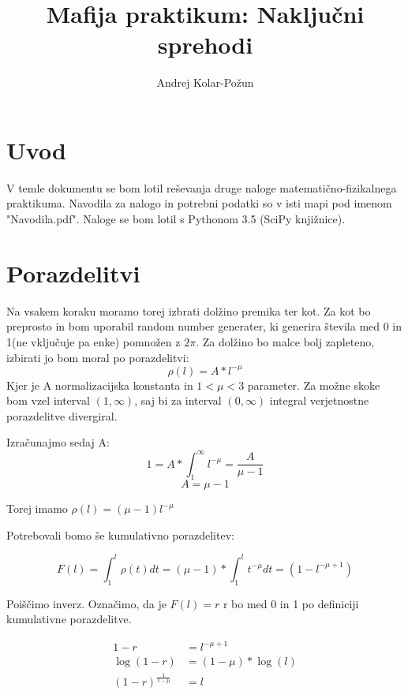 \documentclass{article}
\title{Mafija praktikum: Naklju{\v c}ni sprehodi}
\author{Andrej Kolar-Po{\v z}un}
\begin{document}
\maketitle
\newpage
{}

\section{Uvod}
V temle dokumentu se bom lotil reševanja druge naloge matematično-fizikalnega praktikuma. Navodila za nalogo in potrebni podatki so v isti mapi pod imenom
"Navodila.pdf".
Naloge se bom lotil s Pythonom 3.5 (SciPy knjižnice).

\section{Porazdelitvi}

Na vsakem koraku moramo torej izbrati dolžino premika ter kot. Za kot bo preprosto in bom uporabil random number generater, ki generira števila med 0 in 1(ne vključuje pa enke) pomnožen z $2\pi$.
Za dolžino bo malce bolj zapleteno, izbirati jo bom moral po porazdelitvi:
\begin{equation*}
\rho(l) = A*l^{-\mu}
\end{equation*}
Kjer je A normalizacijska konstanta in $1<\mu<3$ parameter. Za možne skoke bom vzel interval $(1,\infty)$, saj bi za interval $(0,\infty)$ integral verjetnostne porazdelitve divergiral.

Izračunajmo sedaj A:
\begin{equation*}
1 = A* \int_1^\infty l^{-\mu} = \frac{A}{\mu-1} 
\end{equation*}
\begin{equation*}
 A = \mu-1
\end{equation*}

Torej imamo $\rho(l)=(\mu-1)l^{-\mu}$

Potrebovali bomo še kumulativno porazdelitev:

\begin{equation*}
F(l) = \int_1^l \rho(t)dt = (\mu-1)*\int_1^l t^{-\mu}dt = (1-l^{-\mu+1})
\end{equation*}

Poiščimo inverz. Označimo, da je $F(l)=r$ r bo med 0 in 1 po definiciji kumulativne porazdelitve.

\begin{align*}
1-r &= l^{-\mu+1} \\
\log(1-r) &= (1-\mu)*\log(l) \\
 (1-r)^{\frac{1}{1-\mu}}  &= l
\end{align*}
\end{document}
